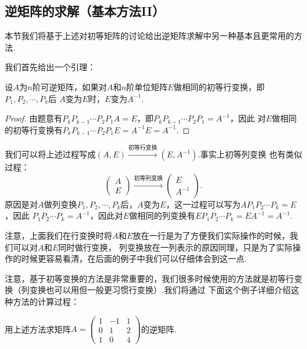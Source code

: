 \subsection{逆矩阵的求解（基本方法II）}
本节我们将基于上述对初等矩阵的讨论给出逆矩阵求解中另一种基本且更常用的方法.

我们首先给出一个引理：
\begin{lemma}
    设$A$为$n$阶可逆矩阵，如果对$A$和$n$阶单位矩阵$E$做相同的初等行变换，即$P_1,P_2,\cdots,P_k$后
    $A$变为$E$时，$E$变为$A^{-1}$.
\end{lemma}
\begin{proof}
    由题意有$P_kP_{k-1}\cdots P_2P_1A=E$，即$P_kP_{k-1}\cdots P_2P_1=A^{-1}$，因此
    对$E$做相同的初等行变换有$P_kP_{k-1}\cdots P_2P_1E=A^{-1}E=A^{-1}$.
\end{proof}

我们可以将上述过程写成$(A,E)\xrightarrow{\text{初等行变换}}(E,A^{-1})$.事实上初等列变换
也有类似过程：
\[\begin{pmatrix}
    A \\ E
\end{pmatrix}\xrightarrow{\text{初等列变换}}\begin{pmatrix}
    E \\ A^{-1}
\end{pmatrix}.\]
原因是对$A$做列变换$P_1,P_2,\cdots,P_k$后，$A$变为$E$，这一过程可以写为$AP_1P_2\cdots P_k=E$，因此
$P_1P_2\cdots P_k=A^{-1}$，因此对$E$做相同的列变换有$EP_1P_2\cdots P_k=EA^{-1}=A^{-1}$.

注意，上面我们在行变换时将$A$和$E$放在一行是为了方便我们实际操作的时候，我们可以对$A$和$E$同时做行变换，
列变换放在一列表示的原因同理，只是为了实际操作的时候更容易看清，在后面的例子中我们可以仔细体会到这一点.

注意，基于初等变换的方法是非常重要的，我们很多时候使用的方法就是初等行变换（列变换也可以用但一般更习惯行变换）.我们将通过
下面这个例子详细介绍这种方法的计算过程：
\begin{example}
    用上述方法求矩阵$A=\begin{pmatrix}1 & -1 & 1 \\ 0 & 1 & 2 \\ 1 & 0 & 4\end{pmatrix}$的逆矩阵.
\end{example}
\begin{solution}

\end{solution}

